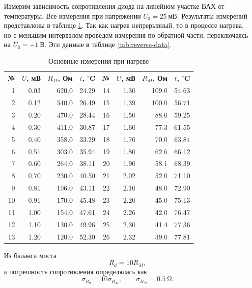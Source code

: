 \documentclass[a4paper,12pt]{article}
\begin{document}
Измерим зависимость сопротивления диода на линейном участке ВАХ от температуры. Все измерения при напряжении $U_0 = 25~\text{мВ}$. Результаты измерений представлены в таблице \ref{tab:main-data}. Так как нагрев непрерывный, то в процессе нагрева, но с меньшим интервалом проведем измерения по обратной части, переключаясь на $U_0 = -1 ~\text{В}$. Эти данные в таблице \ref{tab:reverse-data}.

\begin{table}[h]
    \centering
    \small
    \caption{Основные измерения при нагреве}
    \label{tab:main-data}
    \begin{tabular}{|r|r|r|r||r|r|r|r|}
        \hline
        № & $U$, мВ & $R_M$, Ом & $t$, $^\circ$C & № & $U$, мВ & $R_M$, Ом & $t$, $^\circ$C \\
        \hline
         1 & 0.03 & 620.0 & 24.29 & 14 & 1.30 & 109.0 & 54.63 \\
         2 & 0.12 & 540.0 & 26.49 & 15 & 1.39 & 100.0 & 56.71 \\
         3 & 0.20 & 470.0 & 28.44 & 16 & 1.50 &  88.0 & 59.25 \\
         4 & 0.30 & 411.0 & 30.87 & 17 & 1.60 &  77.3 & 61.55 \\
         5 & 0.40 & 358.0 & 33.29 & 18 & 1.70 &  70.0 & 63.84 \\
         6 & 0.51 & 303.0 & 35.94 & 19 & 1.80 &  62.6 & 66.12 \\
         7 & 0.60 & 264.0 & 38.11 & 20 & 1.90 &  58.1 & 68.39 \\
         8 & 0.70 & 230.0 & 40.50 & 21 & 2.02 &  52.0 & 71.10 \\
         9 & 0.81 & 196.0 & 43.11 & 22 & 2.10 &  48.0 & 72.90 \\
        10 & 0.91 & 170.0 & 45.48 & 23 & 2.20 &  45.0 & 75.13 \\
        11 & 1.00 & 154.0 & 47.61 & 24 & 2.26 &  42.0 & 76.47 \\
        12 & 1.10 & 130.0 & 49.96 & 25 & 2.30 &  41.4 & 77.36 \\
        13 & 1.20 & 120.0 & 52.30 & 26 & 2.32 &  39.0 & 77.81 \\
        \hline
    \end{tabular}
\end{table}

Из баланса моста
\begin{equation}
    R_d = 10 R_M,
\end{equation}
а погрешность сопротивления определялась как
\begin{equation}
    \sigma_{R_d} = 10 \sigma_{R_M}, \qquad \sigma_{R_M} = \SI{0.5}{\ohm}.
\end{equation}
\end{document}
